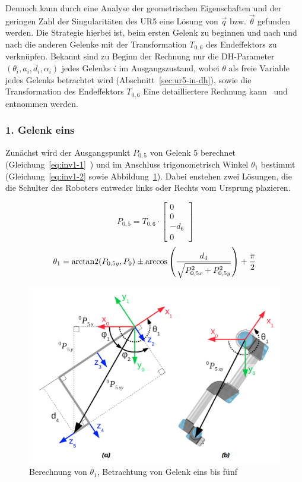Dennoch kann durch eine Analyse der geometrischen Eigenschaften und der geringen Zahl der Singularitäten des UR5 eine Lösung von $\overrightarrow{q}$ bzw. $\overrightarrow{\theta}$ gefunden werden.
Die Strategie hierbei ist, beim ersten Gelenk zu beginnen und nach und nach die anderen Gelenke mit der Transformation $T_{0,6}$ des Endeffektors zu verknüpfen.
Bekannt sind zu Beginn der Rechnung nur die DH-Parameter $(\theta_i, a_i, d_i, \alpha_i)$ jedes Gelenks $i$ im Ausgangszustand, wobei $\theta$ als freie Variable jedes Gelenks betrachtet wird (Abschnitt~\ref{sec:ur5-in-dh}), sowie die Transformation des Endeffektors $T_{0,6}$ Eine detailliertere Rechnung kann~\cite{rasmusandersenKinematicsUR52018} und~\cite{hawkinsAnalyticInverseKinematics2013} entnommen werden.

\subsubsection{1. Gelenk eins}

Zunächst wird der Ausgangspunkt $P_{0,5}$ von Gelenk 5 berechnet (Gleichung~\ref{eq:inv1-1}~\cite[4]{rasmusandersenKinematicsUR52018}) und im Anschluss trigonometrisch Winkel $\theta_1$ bestimmt (Gleichung~\ref{eq:inv1-2} sowie Abbildung~\ref{fig:inv1-1}).
Dabei enstehen zwei Lösungen, die die Schulter des Roboters entweder links oder Rechts vom Ursprung plazieren.

\begin{equation}
    P_{0,5} = T_{0,6} \cdot
    \begin{bmatrix}
        0 \\ 0 \\ -d_6 \\ 0
    \end{bmatrix}
    \label{eq:inv1-1}
\end{equation}
\begin{equation}
    \theta_1 = \operatorname{arctan2}(P_{0,5y}, P_{0}) \pm \arccos \left( \frac{d_4}{ \sqrt{ P_{0,5x}^2 + P_{0,5y}^2 }  } \right) + \frac{\pi}{2}
    \label{eq:inv1-2}
\end{equation}
\begin{figure}[h]
    \centering
    \includegraphics[width = .5\textwidth]{Bilder/inv1}
    \caption{Berechnung von $\theta_1$, Betrachtung von Gelenk eins bis fünf~\cite{rasmusandersenKinematicsUR52018}}\label{fig:inv1-1}
\end{figure}

